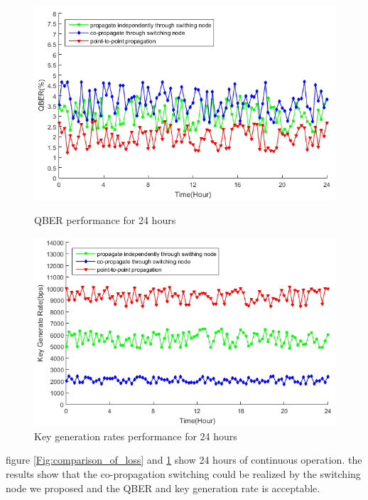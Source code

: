 \documentclass[letterpaper,10pt]{article}
\begin{document}
\begin{figure}[!htb]
   \begin{minipage}{0.48\textwidth}
     \centering
     \includegraphics[width=.9\linewidth]{qber_experiment}
     \caption{QBER performance for 24 hours} \label{Fig:comparison_of_loss}
   \end{minipage}\hfill
   \begin{minipage}{0.48\textwidth}
     \centering
     \includegraphics[width=.9\linewidth]{key_rate_experiment}
     \caption{Key generation rates performance for 24 hours} \label{Fig:comparison_of_rate}
   \end{minipage}
\end{figure}
figure \ref{Fig:comparison_of_loss} and \ref{Fig:comparison_of_rate} show 24 hours of continuous operation. the results show that the co-propagation switching could be realized by the switching node we proposed and the QBER and key generation rate is acceptable. 
\end{document}
